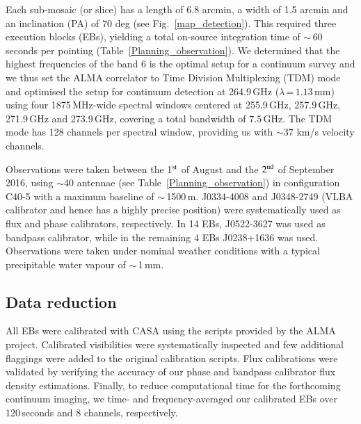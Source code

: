 \documentclass[longauth]{aa}
\begin{document}
Each sub-mosaic (or slice) has a length of 6.8 arcmin, a width of 1.5 arcmin and an inclination (PA) of 70 deg (see Fig.~\ref{map_detection}). This required three execution blocks (EBs), yielding a total on-source integration time of $\sim\,$60 seconds per pointing (Table~\ref{Planning_observation}).
We determined that the highest frequencies of the band 6 is the optimal setup for a continuum survey and we thus set the ALMA correlator to Time Division Multiplexing (TDM) mode and optimised the setup for continuum detection at 264.9\,GHz ($\lambda$\,=\,$1.13$\,mm) using four 1875\,MHz-wide spectral windows centered at 255.9\,GHz, 257.9\,GHz, 271.9\,GHz and 273.9\,GHz, covering a total bandwidth of $7.5\,$GHz.
The TDM mode has 128 channels per spectral window, providing us with $\sim$37 km/s velocity channels.

Observations were taken between the 1$^{\rm{st}}$ of August and the $2^{\rm{nd}}$ of September 2016, using $\sim$40 antennae (see Table~\ref{Planning_observation}) in configuration C40-5 with a maximum baseline of $\sim\,$1500\,m.
J0334-4008 and J0348-2749 (VLBA calibrator and hence has a highly precise position) were systematically used as flux and phase calibrators, respectively.
In 14 EBs, J0522-3627 was used as bandpass calibrator, while in the remaining 4 EBs J0238+1636 was used.
Observations were taken under nominal weather conditions with a typical precipitable water vapour of $\sim\,$1\,mm. 


\subsection{Data reduction}\label{sec:data_reduction}

All EBs were calibrated with CASA \citep{McMullin2007} using the scripts provided by the ALMA project.
Calibrated visibilities were systematically inspected and few additional flaggings were added to the original calibration scripts.
Flux calibrations were validated by verifying the accuracy of our phase and bandpass calibrator flux density estimations. 
Finally, to reduce computational time for the forthcoming continuum imaging, we time- and frequency-averaged our calibrated EBs over 120\,seconds and 8 channels, respectively.
\end{document}
